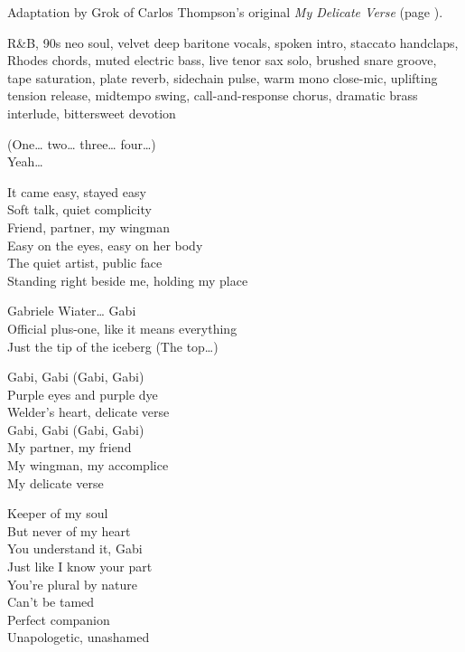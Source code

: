
\begin{notes}
Adaptation by Grok of Carlos Thompson's original \emph{My Delicate Verse} (page \pageref{sec:delicate-verse}).
\end{notes}
\begin{style}
R\&B, 90s neo soul, velvet deep baritone vocals, spoken intro, staccato handclaps, Rhodes chords, muted electric bass, live tenor sax solo, brushed snare groove, tape saturation, plate reverb, sidechain pulse, warm mono close-mic, uplifting tension release, midtempo swing, call-and-response chorus, dramatic brass interlude, bittersweet devotion
\end{style}
\begin{lyrics}
(One… two… three… four…)\\
Yeah…

It came easy, stayed easy\\
Soft talk, quiet complicity\\
Friend, partner, my wingman\\
Easy on the eyes, easy on her body\\
The quiet artist, public face\\
Standing right beside me, holding my place

Gabriele Wiater… Gabi\\
Official plus-one, like it means everything\\
Just the tip of the iceberg
(The top…)

Gabi, Gabi (Gabi, Gabi)\\
Purple eyes and purple dye\\
Welder’s heart, delicate verse\\
Gabi, Gabi (Gabi, Gabi)\\
My partner, my friend\\
My wingman, my accomplice\\
My delicate verse

Keeper of my soul\\
But never of my heart\\
You understand it, Gabi\\
Just like I know your part\\
You’re plural by nature\\
Can’t be tamed\\
Perfect companion\\
Unapologetic, unashamed


\end{lyrics}
